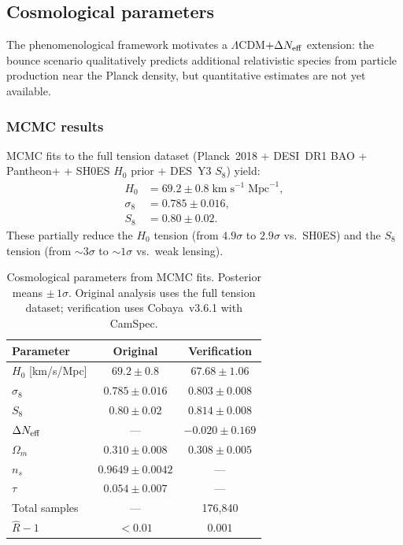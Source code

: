 \documentclass[aps,prd,twocolumn,superscriptaddress,showpacs,preprintnumbers,
  nofootinbib,longbibliography,floatfix]{revtex4-2}
\newcommand{\Neff}{N_{\rm eff}}
\begin{document}
\subsection{Cosmological parameters}\label{sec:cosmo}

The phenomenological framework motivates a $\Lambda$CDM$+\Delta\Neff$
extension: the bounce scenario qualitatively predicts additional
relativistic species from particle production near the Planck density,
but quantitative estimates are not yet available.

\subsubsection{MCMC results}

MCMC fits to the full tension dataset (Planck~2018 + DESI~DR1 BAO +
Pantheon+ + SH0ES $H_0$ prior + DES~Y3 $S_8$) yield:
\begin{align}
  H_0 &= 69.2 \pm 0.8 \;\text{km}\;\text{s}^{-1}\;\text{Mpc}^{-1},
    \label{eq:H0}\\
  \sigma_8 &= 0.785 \pm 0.016, \label{eq:s8}\\
  S_8 &= 0.80 \pm 0.02. \label{eq:S8}
\end{align}
These partially reduce the $H_0$ tension (from $4.9\sigma$ to
$2.9\sigma$ vs.\ SH0ES) and the $S_8$ tension (from $\sim\!3\sigma$ to
$\sim\!1\sigma$ vs.\ weak lensing).

\begin{table}[t]
\caption{\label{tab:mcmc} Cosmological parameters from MCMC fits.
Posterior means $\pm\,1\sigma$. Original analysis uses the full tension
dataset; verification uses Cobaya~v3.6.1 with CamSpec.}
\begin{ruledtabular}
\begin{tabular}{lcc}
\textbf{Parameter} & \textbf{Original} & \textbf{Verification} \\
\hline
$H_0$ [km/s/Mpc] & $69.2 \pm 0.8$ & $67.68 \pm 1.06$ \\
$\sigma_8$ & $0.785 \pm 0.016$ & $0.803 \pm 0.008$ \\
$S_8$ & $0.80 \pm 0.02$ & $0.814 \pm 0.008$ \\
$\Delta\Neff$ & --- & $-0.020 \pm 0.169$ \\
$\Omega_m$ & $0.310 \pm 0.008$ & $0.308 \pm 0.005$ \\
$n_s$ & $0.9649 \pm 0.0042$ & --- \\
$\tau$ & $0.054 \pm 0.007$ & --- \\
\hline
Total samples & --- & 176{,}840 \\
$\hat{R}-1$ & $< 0.01$ & $0.001$ \\
\end{tabular}
\end{ruledtabular}
\end{table}
\end{document}
